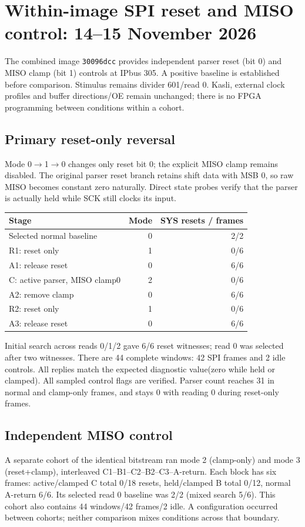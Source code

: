 \clearpage
\section{Within-image SPI reset and MISO control: 14--15 November 2026}
The combined image \texttt{30096dcc} provides independent parser reset (bit 0)
and MISO clamp (bit 1) controls at IPbus 305. A positive baseline is established
before comparison. Stimulus remains divider 601/read 0. Kasli, external clock
profiles and buffer directions/OE remain unchanged; there is no FPGA
programming between conditions within a cohort.

\subsection{Primary reset-only reversal}
Mode 0$\rightarrow$1$\rightarrow$0 changes only reset bit 0; the explicit MISO
clamp remains disabled. The original parser reset branch retains shift data
with MSB 0, so raw MISO becomes constant zero naturally. Direct state probes
verify that the parser is actually held while SCK still clocks its input.
\begin{center}\begin{tabular}{lrr}\toprule
Stage & Mode & SYS resets / frames\\\midrule
Selected normal baseline &0&2/2\\
R1: reset only &1&0/6\\
A1: release reset &0&6/6\\
C: active parser, MISO clamp0 &2&0/6\\
A2: remove clamp &0&6/6\\
R2: reset only &1&0/6\\
A3: release reset &0&6/6\\\bottomrule\end{tabular}\end{center}
Initial search across reads 0/1/2 gave 6/6 reset witnesses; read 0 was selected
after two witnesses. There are 44 complete windows: 42 SPI frames and 2 idle controls.
All replies match the expected diagnostic value(zero while held or clamped).
All sampled control flags are verified. Parser count reaches 31 in normal and
clamp-only frames, and stays 0 with reading 0 during reset-only frames.

\subsection{Independent MISO control}
A separate cohort of the identical bitstream ran mode 2 (clamp-only) and
mode 3 (reset+clamp), interleaved C1--B1--C2--B2--C3--A-return. Each block has
six frames: active/clamped C total 0/18 resets, held/clamped B total 0/12,
normal A-return 6/6. Its selected read 0 baseline was 2/2 (mixed search 5/6).
This cohort also contains 44 windows/42 frames/2 idle. A configuration occurred
between cohorts; neither comparison mixes conditions across that boundary.

